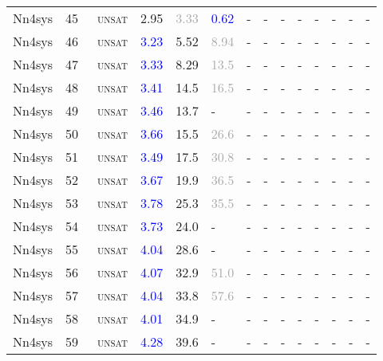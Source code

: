 \begin{center}
{\begin{longtable}{@{}llllllllllllll@{}}
Nn4sys & 45 & ~\textsc{unsat} & \textcolor{second}{2.95} & \textcolor{darkgray}{3.33} & \textcolor{blue}{0.62} & - & - & - & - & - & - & - & - \\
Nn4sys & 46 & ~\textsc{unsat} & \textcolor{blue}{3.23} & \textcolor{second}{5.52} & \textcolor{darkgray}{8.94} & - & - & - & - & - & - & - & - \\
Nn4sys & 47 & ~\textsc{unsat} & \textcolor{blue}{3.33} & \textcolor{second}{8.29} & \textcolor{darkgray}{13.5} & - & - & - & - & - & - & - & - \\
Nn4sys & 48 & ~\textsc{unsat} & \textcolor{blue}{3.41} & \textcolor{second}{14.5} & \textcolor{darkgray}{16.5} & - & - & - & - & - & - & - & - \\
Nn4sys & 49 & ~\textsc{unsat} & \textcolor{blue}{3.46} & \textcolor{second}{13.7} & - & - & - & - & - & - & - & - & - \\
Nn4sys & 50 & ~\textsc{unsat} & \textcolor{blue}{3.66} & \textcolor{second}{15.5} & \textcolor{darkgray}{26.6} & - & - & - & - & - & - & - & - \\
Nn4sys & 51 & ~\textsc{unsat} & \textcolor{blue}{3.49} & \textcolor{second}{17.5} & \textcolor{darkgray}{30.8} & - & - & - & - & - & - & - & - \\
Nn4sys & 52 & ~\textsc{unsat} & \textcolor{blue}{3.67} & \textcolor{second}{19.9} & \textcolor{darkgray}{36.5} & - & - & - & - & - & - & - & - \\
Nn4sys & 53 & ~\textsc{unsat} & \textcolor{blue}{3.78} & \textcolor{second}{25.3} & \textcolor{darkgray}{35.5} & - & - & - & - & - & - & - & - \\
Nn4sys & 54 & ~\textsc{unsat} & \textcolor{blue}{3.73} & \textcolor{second}{24.0} & - & - & - & - & - & - & - & - & - \\
Nn4sys & 55 & ~\textsc{unsat} & \textcolor{blue}{4.04} & \textcolor{second}{28.6} & - & - & - & - & - & - & - & - & - \\
Nn4sys & 56 & ~\textsc{unsat} & \textcolor{blue}{4.07} & \textcolor{second}{32.9} & \textcolor{darkgray}{51.0} & - & - & - & - & - & - & - & - \\
Nn4sys & 57 & ~\textsc{unsat} & \textcolor{blue}{4.04} & \textcolor{second}{33.8} & \textcolor{darkgray}{57.6} & - & - & - & - & - & - & - & - \\
Nn4sys & 58 & ~\textsc{unsat} & \textcolor{blue}{4.01} & \textcolor{second}{34.9} & - & - & - & - & - & - & - & - & - \\
Nn4sys & 59 & ~\textsc{unsat} & \textcolor{blue}{4.28} & \textcolor{second}{39.6} & - & - & - & - & - & - & - & - & - \\

\end{longtable}}
\end{center}
